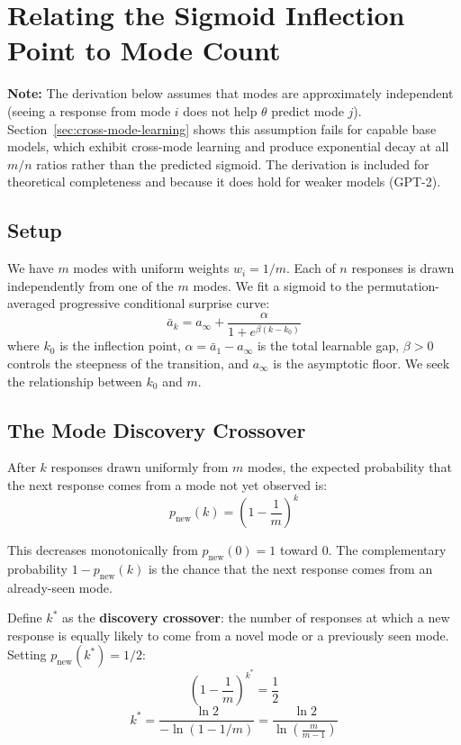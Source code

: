\section{Relating the Sigmoid Inflection Point to Mode Count}\label{app:k0-derivation}

\textbf{Note:} The derivation below assumes that modes are approximately independent (seeing a response from mode $i$ does not help $\theta$ predict mode $j$).
Section~\ref{sec:cross-mode-learning} shows this assumption fails for capable base models, which exhibit cross-mode learning and produce exponential decay at all $m/n$ ratios rather than the predicted sigmoid.
The derivation is included for theoretical completeness and because it does hold for weaker models (GPT-2).

\subsection{Setup}

We have $m$ modes with uniform weights $w_i = 1/m$.
Each of $n$ responses is drawn independently from one of the $m$ modes.
We fit a sigmoid to the permutation-averaged progressive conditional surprise curve:
\begin{equation}
    \bar{a}_k = a_\infty + \frac{\alpha}{1 + e^{\beta(k - k_0)}}
\end{equation}
where $k_0$ is the inflection point, $\alpha = \bar{a}_1 - a_\infty$ is the total learnable gap, $\beta > 0$ controls the steepness of the transition, and $a_\infty$ is the asymptotic floor.
We seek the relationship between $k_0$ and $m$.

\subsection{The Mode Discovery Crossover}

After $k$ responses drawn uniformly from $m$ modes, the expected probability that the next response comes from a mode not yet observed is:
\begin{equation}
    p_{\mathrm{new}}(k) = \left(1 - \frac{1}{m}\right)^{k}
\end{equation}

This decreases monotonically from $p_{\mathrm{new}}(0) = 1$ toward 0.
The complementary probability $1 - p_{\mathrm{new}}(k)$ is the chance that the next response comes from an already-seen mode.

Define $k^*$ as the \textbf{discovery crossover}: the number of responses at which a new response is equally likely to come from a novel mode or a previously seen mode.
Setting $p_{\mathrm{new}}(k^*) = 1/2$:
\begin{equation}
    \left(1 - \frac{1}{m}\right)^{k^*} = \frac{1}{2}
\end{equation}
\begin{equation}\label{eq:kstar}
    k^* = \frac{\ln 2}{-\ln(1 - 1/m)} = \frac{\ln 2}{\ln\!\left(\frac{m}{m-1}\right)}
\end{equation}

